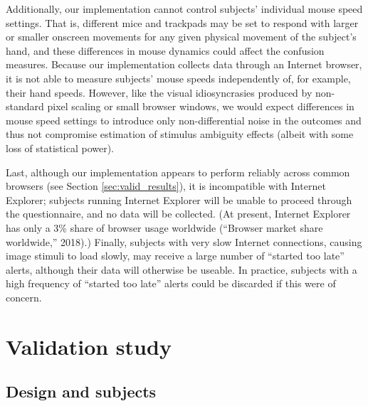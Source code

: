 \documentclass[]{article}
\begin{document}
Additionally, our implementation cannot control subjects' individual
mouse speed settings. That is, different mice and trackpads may be set
to respond with larger or smaller onscreen movements for any given
physical movement of the subject's hand, and these differences in mouse
dynamics could affect the confusion measures. Because our implementation
collects data through an Internet browser, it is not able to measure
subjects' mouse speeds independently of, for example, their hand speeds.
However, like the visual idiosyncrasies produced by non-standard pixel
scaling or small browser windows, we would expect differences in mouse
speed settings to introduce only non-differential noise in the outcomes
and thus not compromise estimation of stimulus ambiguity effects (albeit
with some loss of statistical power).

Last, although our implementation appears to perform reliably across
common browsers (see Section \ref{sec:valid_results}), it is
incompatible with Internet Explorer; subjects running Internet Explorer
will be unable to proceed through the questionnaire, and no data will be
collected. (At present, Internet Explorer has only a 3\% share of
browser usage worldwide (``Browser market share worldwide,'' 2018).)
Finally, subjects with very slow Internet connections, causing image
stimuli to load slowly, may receive a large number of ``started too
late'' alerts, although their data will otherwise be useable. In
practice, subjects with a high frequency of ``started too late'' alerts
could be discarded if this were of concern.

\section{Validation study}
\label{sec:validation}

\subsection{Design and subjects}
\end{document}
